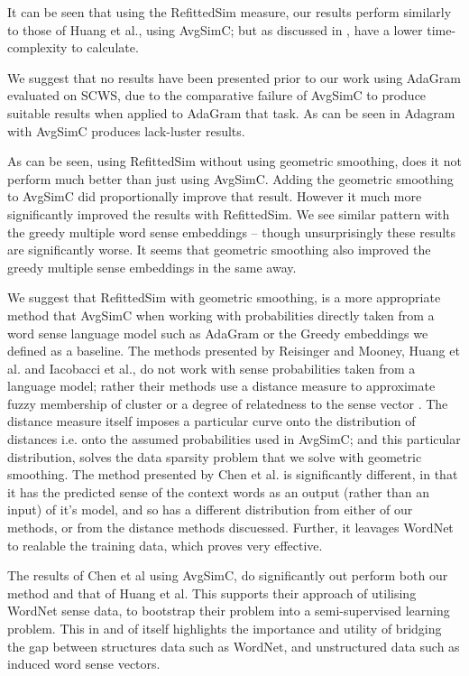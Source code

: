 \documentclass{sig-alternate}
\begin{document}
It can be seen that using the RefittedSim measure, our results perform similarly to those of Huang et al., using AvgSimC; but as discussed in , have a lower time-complexity to calculate.

We suggest that no results have been presented prior to our work using AdaGram evaluated on SCWS, due to the comparative failure of AvgSimC to produce suitable results when applied to AdaGram that task. As can be seen in  Adagram with AvgSimC produces lack-luster results. 

As can be seen, using RefittedSim without using geometric smoothing, does it not perform much better than just using AvgSimC. Adding the geometric smoothing to AvgSimC did proportionally improve that result. However it much more significantly improved the results with RefittedSim. We see similar pattern with the greedy multiple word sense embeddings -- though unsurprisingly these results are significantly worse. It seems that geometric smoothing also improved the greedy multiple sense embeddings in the same away.


We suggest that RefittedSim with geometric smoothing, is a more appropriate method that AvgSimC when working with probabilities directly taken from a word sense language model such as AdaGram or the Greedy embeddings we defined as a baseline. 
The methods presented by Reisinger and Mooney, Huang et al. and Iacobacci et al., do not work with sense probabilities taken from a language model; rather their methods use a distance measure to approximate fuzzy membership of cluster or a degree of relatedness to the sense vector \parencite{Reisinger2010,Huang2012,iacobacci2015sensembed}. The distance measure itself imposes a particular curve onto the distribution of distances i.e. onto the assumed probabilities used in AvgSimC; and this particular distribution, solves the data sparsity problem that we solve with geometric smoothing.
The method presented by Chen et al. is significantly different, in that it has the predicted sense of the context words as an output (rather than an input) of it's model, and so has a different distribution from either of our methods, or from the  distance methods discuessed. Further, it leavages WordNet to realable the training data, which proves very effective.

The results of Chen et al using AvgSimC, do significantly out perform both our method and that of Huang et al. This supports their approach of utilising WordNet sense data, to bootstrap their problem into a semi-supervised learning problem. This in and of itself highlights the importance and utility of bridging the gap between structures data such as WordNet, and unstructured data such as induced word sense vectors.
\end{document}
